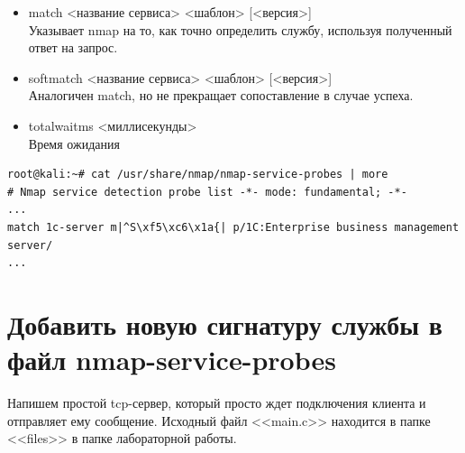 \documentclass[utf8x, 12pt]{G7-32}
\begin{document}
\begin{enumerate}
\begin{itemize}
		\item match <название сервиса> <шаблон> [<версия>]\\
			Указывает nmap на то, как точно определить службу, используя полученный ответ на запрос.
		\item softmatch <название сервиса> <шаблон> [<версия>]\\
			Аналогичен match, но не прекращает сопоставление в случае успеха.
		\item totalwaitms <миллисекунды>\\
			Время ожидания
	\end{itemize}
\end{enumerate}

\begin{lstlisting}
root@kali:~# cat /usr/share/nmap/nmap-service-probes | more
# Nmap service detection probe list -*- mode: fundamental; -*-
...
match 1c-server m|^S\xf5\xc6\x1a{| p/1C:Enterprise business management server/
...
\end{lstlisting}

\newpage
\section{Добавить новую сигнатуру службы в файл nmap-service-probes}

Напишем простой tcp-сервер, который просто ждет подключения клиента и отправляет ему сообщение.  Исходный файл <<main.c>> находится в папке <<files>> в папке лабораторной работы.
\end{document}
